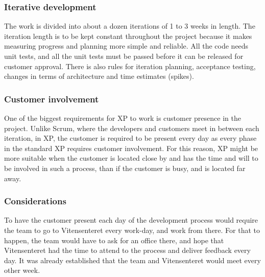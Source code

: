\subsubsection{Iterative development}
The work is divided into about a dozen iterations of 1 to 3 weeks in length. The iteration length is to be kept constant throughout the project because it makes measuring progress and planning more simple and reliable. All the code needs unit tests, and all the unit tests must be passed before it can be released for customer approval. There is also rules for iteration planning, acceptance testing, changes in terms of architecture and time estimates (spikes). 

\subsubsection{Customer involvement}
One of the biggest requirements for XP to work is customer presence in the project. Unlike Scrum, where the developers and customers meet in between each iteration, in XP, the customer is required to be present every day as every phase in the standard XP requires customer involvement. For this reason, XP might be more suitable when the customer is located close by and has the time and will to be involved in such a process, than if the customer is busy, and is located far away. 

\subsubsection{Considerations}
To have the customer present each day of the development process would require the team to go to Vitensenteret every work-day, and work from there. For that to happen, the team would have to ask for an office there, and hope that Vitensenteret had the time to attend to the process and deliver feedback every day. It was already established that the team and Vitensenteret would meet every other week. \cite{XP_iterativedevelopment}